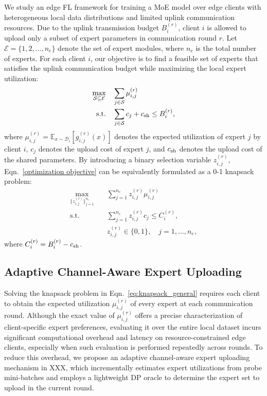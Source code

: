 \documentclass[conference]{IEEEtran}
\newcommand{\xxx}{XXX}%
\begin{document}
We study an edge FL framework for training a MoE model over edge clients with heterogeneous local data distributions and limited uplink communication resources. Due to the uplink transmission budget $B_i^{(r)}$, client $i$ is allowed to upload only a subset of expert parameters in communication round $r$. Let $\mathcal{E}=\{1,2,\ldots,n_e\}$ denote the set of expert modules, where $n_e$ is the total number of experts. For each client $i$, our objective is to find a feasible set of experts that satisfies the uplink communication budget while maximizing the local expert utilization:
\begin{equation}
\label{optimization objective}
\begin{aligned}
\max_{\mathcal{S}\subseteq \mathcal{E}}
\quad &
\sum_{j\in \mathcal{S}}\mu_{i,j}^{(r)}
\\
\mathrm{s.t.}
\quad
&
\sum_{j\in \mathcal{S}} c_j + c_{\rm sh}
\le B_i^{(r)} ,
\end{aligned}
\end{equation}
where $\mu_{i,j}^{(r)}=\mathbb{E}_{x\sim\mathcal{D}_i}[g_{i,j}^{(r)}(x)]$ denotes the expected utilization of expert $j$ by client $i$, $c_j$ denotes the upload cost of expert $j$, and $c_{\rm sh}$ denotes the upload cost of the shared parameters. By introducing a binary selection variable $z_{i,j}^{(r)}$, Eqn.~\eqref{optimization objective} can be equivalently formulated as a 0-1 knapsack problem:
\begin{equation}
\label{eq:knapsack_general}
\begin{aligned}
\max_{\{z_{i,j}^{(r)}\}_{j=1}^{n_e}}
\quad &
\sum_{j=1}^{n_e} z_{i,j}^{(r)} \mu_{i,j}^{(r)}
\\
\mathrm{s.t.}
\quad &
\sum_{j=1}^{n_e} z_{i,j}^{(r)} c_j
\le C_i^{(r)},
\\
&
z_{i,j}^{(r)}\in\{0,1\},
\quad j=1,\ldots,n_e ,
\end{aligned}
\end{equation}
where $C_i^{(r)} = B_i^{(r)} - c_{\rm sh}$. 

\subsection{Adaptive Channel-Aware Expert Uploading}
\label{subsec:proactive_channel_aware}
Solving the knapsack problem in Eqn.~\eqref{eq:knapsack_general} requires each client to obtain the expected utilization $\mu_{i,j}^{(r)}$ of every expert at each communication round. Although the exact value of $\mu_{i,j}^{(r)}$ offers a precise characterization of client-specific expert preferences, evaluating it over the entire local dataset incurs significant computational overhead and latency on resource-constrained edge clients, especially when such evaluation is performed repeatedly across rounds. To reduce this overhead, we propose an adaptive channel-aware expert uploading mechanism in \xxx, which incrementally estimates expert utilizations from probe mini-batches and employs a lightweight DP oracle to determine the expert set to upload in the current round.
\end{document}
